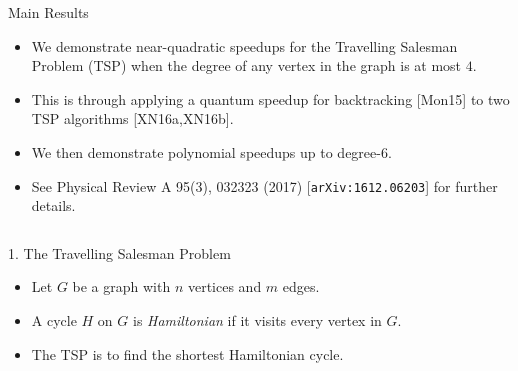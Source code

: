 \documentclass[]{templates/poster}
\begin{document}

\begin{frame}{} 

\begin{columns}[t]
  \begin{column}{0.900\linewidth}
  \begin{block}{\Large Main Results}
  \begin{itemize}
  \item We demonstrate near-quadratic speedups for the Travelling Salesman Problem (TSP) when the degree of any vertex in the graph is at most $4$.
  
  \item This is through applying a quantum speedup for backtracking [Mon15] to two TSP algorithms [XN16a,XN16b].
  
  \item We then demonstrate polynomial speedups up to degree-6.
  
  \item See Physical Review A 95(3), 032323 (2017) [{\tt arXiv:1612.06203}] for further details.
  \end{itemize}
  \end{block}
  \end{column}
\end{columns}

\begin{columns}[t]
  \begin{column}{0.422\linewidth}
  \begin{block}{\Large 1. The Travelling Salesman Problem}
  \begin{itemize}
  \item Let $G$ be a graph with $n$ vertices and $m$ edges.
  
  \item A cycle $H$ on $G$ is {\em Hamiltonian} if it visits every vertex in $G$.
  
  \item The TSP is to find the shortest Hamiltonian cycle.
  

\end{itemize}
\end{block}
\end{column}
\end{columns}
\end{frame}
\end{document}
